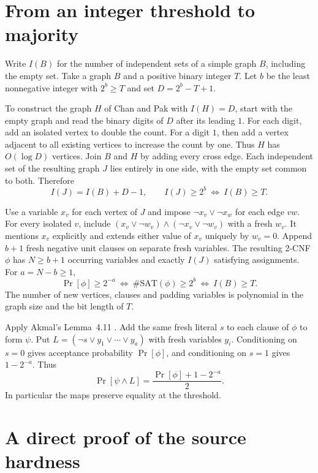\documentclass[11pt,a4paper]{amsart}
\newcommand{\sat}{\#\mathrm{SAT}}
\begin{document}
\section{From an integer threshold to majority}

Write \(I(B)\) for the number of independent sets of a simple graph \(B\), including the empty set. Take a graph \(B\) and a positive binary integer \(T\). Let \(b\) be the least nonnegative integer with \(2^b\ge T\) and set \(D=2^b-T+1\).

To construct the graph \(H\) of Chan and Pak \cite[Ex.~5.8]{chanpak} with \(I(H)=D\), start with the empty graph and read the binary digits of \(D\) after its leading \(1\). For each digit, add an isolated vertex to double the count. For a digit \(1\), then add a vertex adjacent to all existing vertices to increase the count by one. Thus \(H\) has \(O(\log D)\) vertices. Join \(B\) and \(H\) by adding every cross edge. Each independent set of the resulting graph \(J\) lies entirely in one side, with the empty set common to both. Therefore
\[
 I(J)=I(B)+D-1,\qquad I(J)\ge 2^b\ \Longleftrightarrow\ I(B)\ge T.
\]

Use a variable \(x_v\) for each vertex of \(J\) and impose \(\neg x_v\lor\neg x_w\) for each edge \(vw\). For every isolated \(v\), include
\((x_v\lor\neg w_v)\wedge(\neg x_v\lor\neg w_v)\) with a fresh \(w_v\). It mentions \(x_v\) explicitly and extends either value of \(x_v\) uniquely by \(w_v=0\). Append \(b+1\) fresh negative unit clauses on separate fresh variables. The resulting 2-CNF \(\phi\) has \(N\ge b+1\) occurring variables and exactly \(I(J)\) satisfying assignments. For \(a=N-b\ge1\),
\[
  \Pr[\phi]\ge 2^{-a}\ \Longleftrightarrow\ \sat(\phi)\ge 2^b
       \ \Longleftrightarrow\ I(B)\ge T .
\]
The number of new vertices, clauses and padding variables is polynomial in the graph size and the bit length of \(T\).

Apply Akmal's Lemma~4.11 \cite{akmal}. Add the same fresh literal \(s\) to each clause of \(\phi\) to form \(\psi\). Put \(L=(\neg s\lor y_1\lor\cdots\lor y_a)\) with fresh variables \(y_i\). Conditioning on \(s=0\) gives acceptance probability \(\Pr[\phi]\), and conditioning on \(s=1\) gives \(1-2^{-a}\). Thus
\[
 \Pr[\psi\wedge L]=\frac{\Pr[\phi]+1-2^{-a}}2 .
\]
In particular the maps preserve equality at the threshold.

\section{A direct proof of the source hardness}
\end{document}
